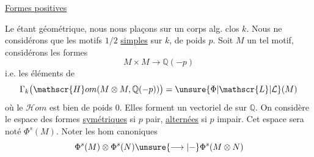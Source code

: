 \uline{Formes positives}

Le  étant géométrique, nous nous plaçons sur un corps alg. clos $k$. Nous ne considérons que les motifs $1/2$ \uline{simples} sur $k$,  de poids $p$. Soit $M$ un tel motif, considérons les formes
\[
M\times M\longrightarrow\mathbb{Q}(-p)
\]
i.e. les éléments de
\[
\Gamma_k\bigl(\mathscr{H}om(M\otimes M,\mathbb{Q}(-p))\bigr)
=\unsure{\Phi|\mathscr{L}|\mathcal{L}}(M)
\]
où le  $\mathscr{H}om$ est bien de poids $0$. Elles forment un vectoriel de  sur $\mathbb{Q}$. On considère le espace   des formes \uline{symétriques} si $p$ pair, \uline{alternées} si $p$ impair. Cet espace sera noté $\Phi^s(M)$. Noter les hom canoniques
\[
\Phi^s(M)\otimes\Phi^s(N)\unsure{\longrightarrow|\mathbin{-}}\Phi^s(M\otimes N)
\]
